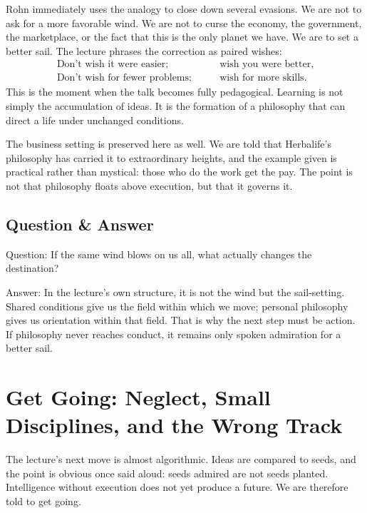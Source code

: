 Rohn immediately uses the analogy to close down several evasions. We are not to ask for a more favorable wind. We are not to curse the economy, the government, the marketplace, or the fact that this is the only planet we have. We are to set a better sail. The lecture phrases the correction as paired wishes:
\begin{align}
\text{Don't wish it were easier};\qquad &\text{wish you were better},\\
\text{Don't wish for fewer problems};\qquad &\text{wish for more skills}.
\end{align}
This is the moment when the talk becomes fully pedagogical. Learning is not simply the accumulation of ideas. It is the formation of a philosophy that can direct a life under unchanged conditions.

The business setting is preserved here as well. We are told that Herbalife's philosophy has carried it to extraordinary heights, and the example given is practical rather than mystical: those who do the work get the pay. The point is not that philosophy floats above execution, but that it governs it.

\subsection{Question \& Answer}

Question: If the same wind blows on us all, what actually changes the destination?

Answer: In the lecture's own structure, it is not the wind but the sail-setting. Shared conditions give us the field within which we move; personal philosophy gives us orientation within that field. That is why the next step must be action. If philosophy never reaches conduct, it remains only spoken admiration for a better sail.

\section{Get Going: Neglect, Small Disciplines, and the Wrong Track}

The lecture's next move is almost algorithmic. Ideas are compared to seeds, and the point is obvious once said aloud: seeds admired are not seeds planted. Intelligence without execution does not yet produce a future. We are therefore told to get going.

